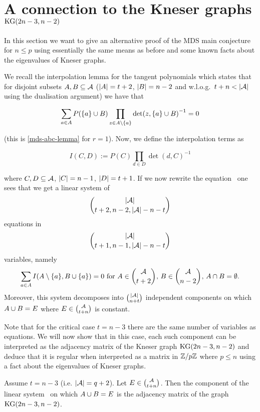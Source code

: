 
\section{A connection to the Kneser graphs $\mathop\mathrm{KG}(2n-3,n-2)$}

In this section we want to give an alternative proof of the MDS main conjecture for $n\leq p$ using essentially the same means as before and some known facts about the eigenvalues of Kneser graphs.

We recall the interpolation lemma for the tangent polynomials which states that for disjoint subsets $A,B\subseteq \mathcal{A}$ ($\left|A\right|=t+2$, $\left|B\right|=n-2$ and w.l.o.g.~$t+n < \left|\mathcal{A}\right|$ using the dualisation argument)
we have that

$$
\sum_{a\in A}{P(\left\{a\right\}\cup B)\prod_{z\in A\setminus \left\{a\right\}}{\det(z,\left\{a\right\}\cup B)}^{-1}}=0\label{mds-tan-poly-interpol}
$$

(this is \autoref{mds-abc-lemma} for $r=1$). Now, we define the interpolation terms as

$$
I(C,D):=P(C)\prod_{d\in D}{{\det(d,C)}^{-1}}
$$
  
where $C,D\subseteq \mathcal{A}$, $\left|C\right|=n-1$, $\left|D\right|=t+1$.
If we now rewrite the equation~ %
one sees that we get a linear system of
$$
\binom{\card\cA}{t+2,n-2,\card\cA-n-t}
$$
equations in
$$
\binom{\card\cA}{t+1,n-1,\card\cA-n-t}
$$
variables, namely
$$%
\sum_{a\in A}{I(A\setminus\{a\}, B\setjoin\{a\})}=0\text{ for $A\in\binom{\cA}{t+2}$, $B\in\binom{\cA}{n-2}$, $A\setmeet B=\emptyset$}.\label{mds-interpol-sys}
$$
Moreover, this system decomposes into $\binom{\card\cA}{n+t}$ independent components on which $A\cup B=E$ where $E\in\binom{\cA}{t+n}$ is constant.

Note that for the critical case $t=n-3$ there are the same number of variables as equations.
We will now show that in this case, each such component can be interpreted as the adjacency matrix of the Kneser graph $\mathop\mathrm{KG}(2n-3,n-2)$ and deduce that it is regular when interpreted as a matrix in $\mathbb{Z}/p\mathbb{Z}$ where $p\leq n$ using a fact about the eigenvalues of Kneser graphs.

\begin{lemma}
    Assume $t=n-3$ (i.e. $\left|\mathcal{A}\right|=q+2$).
    Let $E\in\binom{\cA}{t+n}$. Then the component of the linear system~
    on which $A\cup B=E$ is the adjacency matrix of the graph $\mathop\mathrm{KG}(2n-3,n-2)$.
\end{lemma} 

